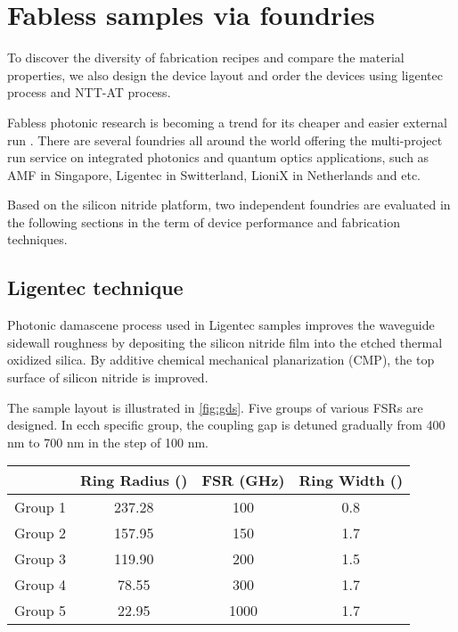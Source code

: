 
\chapter{Fabless samples via foundries}

To discover the diversity of fabrication recipes and compare the material properties, we also design the device layout and order the devices using ligentec process and NTT-AT process.

Fabless photonic research is becoming a trend for its cheaper and easier external run \cite{Hochberg2010}. There are several foundries all around the world offering the multi-project run service on integrated photonics and quantum optics applications, such as AMF in Singapore, Ligentec in Switterland, LioniX in Netherlands and etc. 

Based on the silicon nitride platform, two independent foundries are evaluated in the following sections in the term of device performance and fabrication techniques.

\section{Ligentec technique}
Photonic damascene process \cite{Pfeiffer2015a,Pfeiffer2018a} used in Ligentec samples improves the waveguide sidewall roughness by depositing the silicon nitride film into the etched thermal oxidized silica. By additive chemical mechanical planarization (CMP), the top surface of silicon nitride is improved.

The sample layout is illustrated in \autoref{fig:gds}. Five groups of various FSRs are designed. In ecch specific group, the coupling gap is detuned gradually from 400 nm to 700 nm in the step of 100 nm.


\begin{table}[]
	\begin{tabular}{cccc}
		& Ring Radius (\um) & FSR (GHz) & Ring Width (\um) \\ \hline
		Group 1 & 237.28                                                 & 100       & 0.8                                                   \\ \hline
		Group 2 & 157.95                                                 & 150       & 1.7                                                   \\ \hline
		Group 3 & 119.90                                                 & 200       & 1.5                                                   \\ \hline
		Group 4 & 78.55                                                  & 300       & 1.7                                                   \\ \hline
		Group 5 & 22.95                                                  & 1000      & 1.7                                                   \\ \hline
	\end{tabular}
\end{table}

